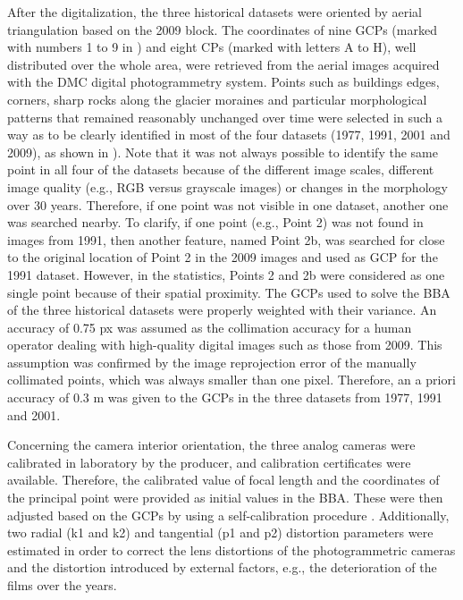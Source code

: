 After the digitalization, the three historical datasets were oriented by aerial triangulation based on the 2009 block. The coordinates of nine GCPs (marked with numbers 1 to 9 in ) and eight CPs (marked with letters A to H), well distributed over the whole area, were retrieved from the aerial images acquired with the DMC digital photogrammetry system.
Points such as buildings edges, corners, sharp rocks along the glacier moraines and particular morphological patterns that remained reasonably unchanged over time were selected in such a way as to be clearly identified in most of the four datasets (1977, 1991, 2001 and 2009), as shown in ).
Note that it was not always possible to identify the same point in all four of the datasets because of the different image scales, different image quality (e.g., RGB versus grayscale images) or changes in the morphology over 30 years. Therefore, if one point was not visible in one dataset, another one was searched nearby. To clarify, if one point (e.g., Point 2) was not found in images from 1991, then another feature, named Point 2b, was searched for close to the original location of Point 2 in the 2009 images and used as GCP for the 1991 dataset. However, in the statistics, Points 2 and 2b were considered as one single point because of their spatial proximity.
The GCPs used to solve the BBA of the three historical datasets were properly weighted with their variance. An accuracy of 0.75 px was assumed as the collimation accuracy for a human operator dealing with high-quality digital images such as those from 2009. This assumption was confirmed by the image reprojection error of the manually collimated points, which was always smaller than one pixel. Therefore, an a priori accuracy of 0.3 m was given to the GCPs in the three datasets from 1977, 1991 and 2001.

Concerning the camera interior orientation, the three analog cameras were calibrated in laboratory by the producer, and calibration certificates were available. Therefore, the calibrated value of focal length and the coordinates of the principal point were provided as initial values in the BBA. These were then adjusted based on the GCPs by using a self-calibration procedure \citep{jacobsen2004issues}. Additionally, two radial (k1 and k2) and tangential (p1 and p2) distortion parameters were estimated in order to correct the lens distortions of the photogrammetric cameras and the distortion introduced by external factors, e.g., the deterioration of the films over the years.

